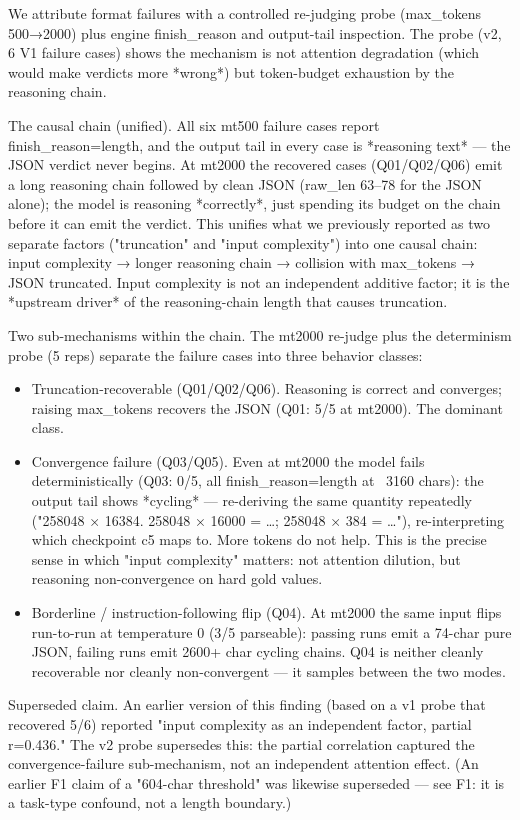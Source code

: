\documentclass[10pt,twocolumn]{article}
\begin{document}
We attribute format failures with a controlled re-judging probe (max\_tokens 500→2000) plus engine finish\_reason and output-tail inspection. The probe (v2, 6 V1 failure cases) shows the mechanism is not attention degradation (which would make verdicts more *wrong*) but token-budget exhaustion by the reasoning chain.


The causal chain (unified). All six mt500 failure cases report finish\_reason=length, and the output tail in every case is *reasoning text* — the JSON verdict never begins. At mt2000 the recovered cases (Q01/Q02/Q06) emit a long reasoning chain followed by clean JSON (raw\_len 63–78 for the JSON alone); the model is reasoning *correctly*, just spending its budget on the chain before it can emit the verdict. This unifies what we previously reported as two separate factors ("truncation" and "input complexity") into one causal chain: input complexity → longer reasoning chain → collision with max\_tokens → JSON truncated. Input complexity is not an independent additive factor; it is the *upstream driver* of the reasoning-chain length that causes truncation.


Two sub-mechanisms within the chain. The mt2000 re-judge plus the determinism probe (5 reps) separate the failure cases into three behavior classes:


\begin{itemize}
  \item Truncation-recoverable (Q01/Q02/Q06). Reasoning is correct and converges; raising max\_tokens recovers the JSON (Q01: 5/5 at mt2000). The dominant class.
  \item Convergence failure (Q03/Q05). Even at mt2000 the model fails deterministically (Q03: 0/5, all finish\_reason=length at ~3160 chars): the output tail shows *cycling* — re-deriving the same quantity repeatedly ("258048 × 16384. 258048 × 16000 = …; 258048 × 384 = …"), re-interpreting which checkpoint c5 maps to. More tokens do not help. This is the precise sense in which "input complexity" matters: not attention dilution, but reasoning non-convergence on hard gold values.
  \item Borderline / instruction-following flip (Q04). At mt2000 the same input flips run-to-run at temperature 0 (3/5 parseable): passing runs emit a 74-char pure JSON, failing runs emit 2600+ char cycling chains. Q04 is neither cleanly recoverable nor cleanly non-convergent — it samples between the two modes.
\end{itemize}


Superseded claim. An earlier version of this finding (based on a v1 probe that recovered 5/6) reported "input complexity as an independent factor, partial r=0.436." The v2 probe supersedes this: the partial correlation captured the convergence-failure sub-mechanism, not an independent attention effect. (An earlier F1 claim of a "604-char threshold" was likewise superseded — see F1: it is a task-type confound, not a length boundary.)
\end{document}
